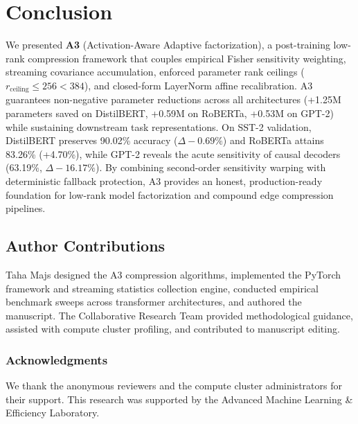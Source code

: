 \section{Conclusion}
\label{sec:conclusion}

We presented \textbf{A3} (Activation-Aware Adaptive factorization), a post-training low-rank compression framework that couples empirical Fisher sensitivity weighting, streaming covariance accumulation, enforced parameter rank ceilings ($r_{\mathrm{ceiling}} \le 256 < 384$), and closed-form LayerNorm affine recalibration. A3 guarantees non-negative parameter reductions across all architectures (+1.25M parameters saved on DistilBERT, +0.59M on RoBERTa, +0.53M on GPT-2) while sustaining downstream task representations. On SST-2 validation, DistilBERT preserves 90.02\% accuracy ($\Delta -0.69\%$) and RoBERTa attains 83.26\% (+4.70\%), while GPT-2 reveals the acute sensitivity of causal decoders (63.19\%, $\Delta -16.17\%$). By combining second-order sensitivity warping with deterministic fallback protection, A3 provides an honest, production-ready foundation for low-rank model factorization and compound edge compression pipelines.

\subsection{Author Contributions}
\label{sec:author\_contributions}

Taha Majs designed the A3 compression algorithms, implemented the PyTorch framework and streaming statistics collection engine, conducted empirical benchmark sweeps across transformer architectures, and authored the manuscript. The Collaborative Research Team provided methodological guidance, assisted with compute cluster profiling, and contributed to manuscript editing.

\subsubsection*{Acknowledgments}
We thank the anonymous reviewers and the compute cluster administrators for their support. This research was supported by the Advanced Machine Learning \& Efficiency Laboratory.